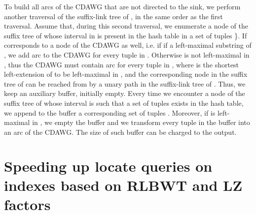 \documentclass[a4paper,UKenglish]{lipics-v2016}
\begin{document}
To build all arcs of the CDAWG that are not directed to the sink, we perform another traversal of the suffix-link tree of , in the same order as the first traversal. Assume that, during this second traversal, we enumerate a node  of the suffix tree of  whose interval in  is present in the hash table in a set of tuples \}. If  corresponds to a node  of the CDAWG as well, i.e. if  if a left-maximal substring of , we add arc  to the CDAWG for every tuple in . Otherwise  is not left-maximal in , thus the CDAWG must contain arc  for every tuple in , where  is the shortest left-extension of  to be left-maximal in , and the corresponding node  in the suffix tree of  can be reached from  by a unary path in the suffix-link tree of . Thus, we keep an auxiliary buffer, initially empty. Every time we encounter a node  of the suffix tree of  whose interval  is such that a set of tuples  exists in the hash table, we append to the buffer a corresponding set of tuples . Moreover, if  is left-maximal in , we empty the buffer and we transform every tuple  in the buffer into an arc  of the CDAWG. The size of such buffer can be charged to the output.











\section{Speeding up locate queries on indexes based on RLBWT and LZ factors} \label{sec:heuristics}
\end{document}
